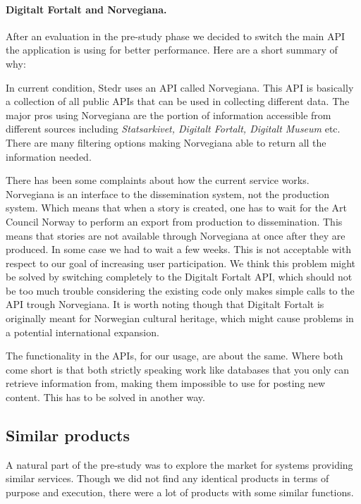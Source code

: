 \paragraph{Digitalt Fortalt and Norvegiana.}

After an evaluation in the pre-study phase we decided to switch the main API the application is using for better performance. Here are a short summary of why:

In current condition, Stedr uses an API called Norvegiana. This API is basically a collection of all public APIs that can be used in collecting different data. The major pros using Norvegiana are the portion of information accessible from different sources including \emph{Statsarkivet, Digitalt Fortalt, Digitalt Museum} etc. There are many filtering options making Norvegiana able to return all the information needed.

There has been some complaints about how the current service works. Norvegiana is an interface to the dissemination system, not the production system. Which means that when a story is created, one has to wait for the Art Council Norway to perform an export from production to dissemination. This means that stories are not available through Norvegiana at once after they are produced. In some case we had to wait a few weeks. This is not acceptable with respect to our goal of increasing user participation. We think this problem might be solved by switching completely to the Digitalt Fortalt API, which should not be too much trouble considering the existing code only makes simple calls to the API trough Norvegiana. It is worth noting though that Digitalt Fortalt is originally meant for Norwegian cultural heritage, which might cause problems in a potential international expansion.

The functionality in the APIs, for our usage, are about the same. Where both come short is that both strictly speaking work like databases that you only can retrieve information from, making them impossible to use for posting new content. This has to be solved in another way.

	\subsection{Similar products}
		
A natural part of the pre-study was to explore the market for systems providing similar services. Though we did not find any identical products in terms of purpose and execution, there were a lot of products with some similar functions. 


